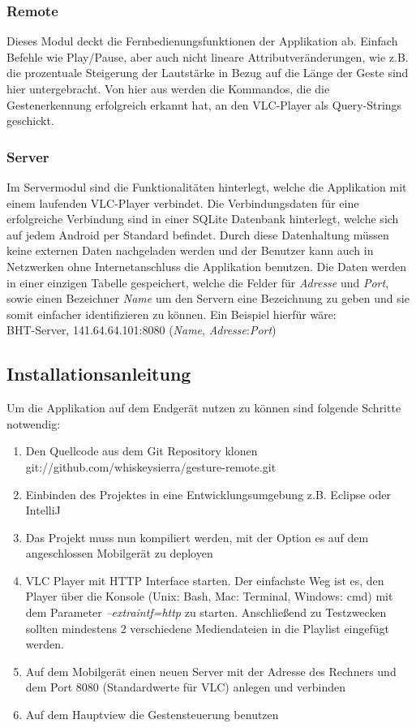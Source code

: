 \documentclass[a4paper,12pt]{article}
\begin{document}
\subsubsection{Remote}
Dieses Modul deckt die Fernbedienungsfunktionen der Applikation ab. Einfach Befehle wie Play/Pause, aber auch nicht lineare Attributveränderungen, wie z.B. die prozentuale Steigerung der Lautstärke in Bezug auf die Länge der Geste sind hier untergebracht. Von hier aus werden die Kommandos, die die Gestenerkennung erfolgreich erkannt hat, an den VLC-Player als Query-Strings geschickt.
\subsubsection{Server}
Im Servermodul sind die Funktionalitäten hinterlegt, welche die Applikation mit einem laufenden VLC-Player verbindet. Die Verbindungsdaten für eine erfolgreiche Verbindung sind in einer SQLite Datenbank hinterlegt, welche sich auf jedem Android per Standard befindet. Durch diese Datenhaltung müssen keine externen Daten nachgeladen werden und der Benutzer kann auch in Netzwerken ohne Internetanschluss die Applikation benutzen.
Die Daten werden in einer einzigen Tabelle gespeichert, welche die Felder für \textit{Adresse} und \textit{Port}, sowie einen Bezeichner \textit{Name} um den Servern eine Bezeichnung zu geben und sie somit einfacher identifizieren zu können. Ein Beispiel hierfür wäre: \\
BHT-Server, 141.64.64.101:8080 (\textit{Name}, \textit{Adresse}:\textit{Port})\\

\newpage
\subsection{Installationsanleitung}
Um die Applikation auf dem Endgerät nutzen zu können sind folgende Schritte notwendig:
\begin{enumerate}
\item Den Quellcode aus dem Git Repository klonen \\git://github.com/whiskeysierra/gesture-remote.git
\item Einbinden des Projektes in eine Entwicklungsumgebung z.B. Eclipse oder IntelliJ
\item Das Projekt muss nun kompiliert werden, mit der Option es auf dem angeschlossen Mobilgerät zu deployen
\item VLC Player mit HTTP Interface starten. Der einfachste Weg ist es, den Player über die Konsole (Unix: Bash, Mac: Terminal, Windows: cmd) mit dem Parameter \textit{--extraintf=http} zu starten. Anschließend zu Testzwecken sollten mindestens 2 verschiedene Mediendateien in die Playlist eingefügt werden.
\item Auf dem Mobilgerät einen neuen Server mit der Adresse des Rechners und dem Port 8080 (Standardwerte für VLC) anlegen und verbinden
\item Auf dem Hauptview die Gestensteuerung benutzen
\end{enumerate}
\newpage
\end{document}
